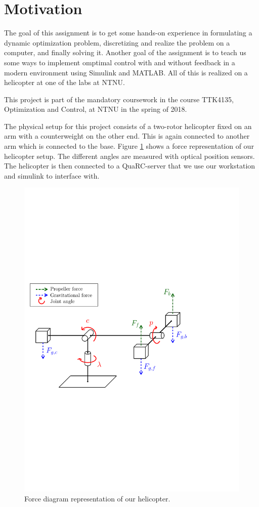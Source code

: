\section*{Motivation}\label{sec:intro}
The goal of this assignment is to get some hands-on experience in formulating a dynamic optimization problem, discretizing and realize the problem on a computer, and finally solving it. Another goal of the assignment is to teach us some ways to implement omptimal control with and without feedback in a modern environment using Simulink and MATLAB. All of this is realized on a helicopter at one of the labs at NTNU.

This project is part of the mandatory coursework in the course TTK4135, Optimization and Control, at NTNU in the spring of 2018.

The physical setup for this project consists of a two-rotor helicopter fixed on an arm with a counterweight on the other end. This is again connected to another arm which is connected to the base. Figure \cref{fig:heli} shows a force representation of our helicopter setup. The different angles are measured with optical position sensors. The helicopter is then connected to a QuaRC-server that we use our workstation and simulink to interface with.


\begin{figure}[tp]
	\centering
	\includegraphics[width=1.00\textwidth]{figures/forces.pdf}
	\caption{Force diagram representation of our helicopter.}
\label{fig:heli}
\end{figure}